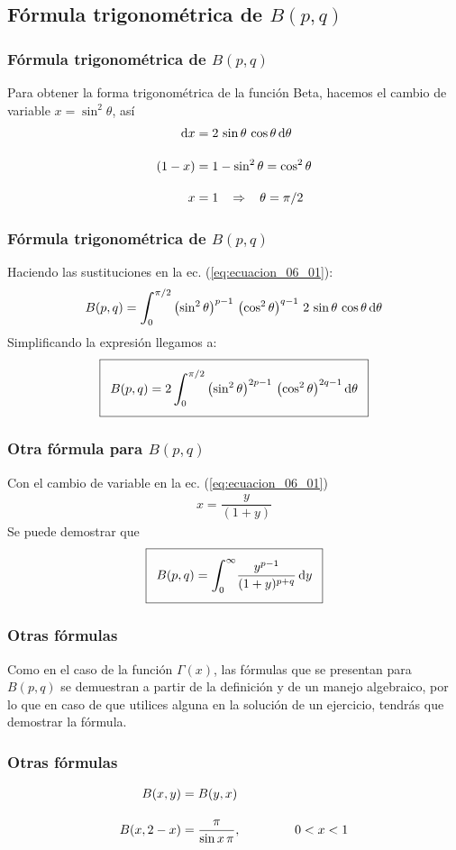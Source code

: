 \documentclass[12pt]{beamer}
\begin{document}
\subsection{Fórmula trigonométrica de \texorpdfstring{$B(p,q)$}{B(p, q)}}
\begin{frame}
\frametitle{Fórmula trigonométrica de $B(p,q)$}
Para obtener la forma trigonométrica de la función Beta, hacemos el cambio de variable $x = \sin^{2} \theta$, así
\begin{align*}
\dd{x} &= 2 \, \sin \theta \, \cos \theta \dd{\theta} \\[1em]
(1 - x) &= 1 - \sin^{2} \theta = \cos^{2} \theta \\[1em]
x &= 1 \hspace{0.3cm} \Rightarrow \hspace{0.3cm} \theta = \pi/2
\end{align*}
\end{frame}
\begin{frame}
\frametitle{Fórmula trigonométrica de $B(p, q)$}
Haciendo las sustituciones en la ec. (\ref{eq:ecuacion_06_01}):
{\fontsize{12}{12}\selectfont
\begin{align}
B(p, q) = \scaleint{6ex}_{\bs 0}^{\pi/2} \left( \sin^{2} \theta \right)^{p-1} \, \left( \cos^{2} \theta \right)^{q-1} \, 2 \, \sin \theta \, \cos \theta \dd{\theta}
\end{align}}
\pause
Simplificando la expresión llegamos a:
{\fontsize{12}{12}\selectfont
\begin{align}
\addtolength{\fboxsep}{5pt}\boxed{B(p, q) = 2 \, \scaleint{6ex}_{\bs 0}^{\pi/2} \left( \sin^{2} \theta \right)^{2p-1} \, \left( \cos^{2} \theta \right)^{2q-1} \dd{\theta}}
\label{eq:ecuacion_06_04}
\end{align}}
\end{frame}
\begin{frame}
\frametitle{Otra fórmula para $B(p, q)$}
Con el cambio de variable en la ec. (\ref{eq:ecuacion_06_01})
\begin{align*}
x = \dfrac{y}{(1 + y)}
\end{align*}
\pause
Se puede demostrar que
\begin{align}
\addtolength{\fboxsep}{5pt}\boxed{B(p, q) = \scaleint{6ex}_{\bs 0}^{\infty} \dfrac{y^{p-1}}{(1 + y)^{p+q}} \dd{y}}
\label{eq:ecuacion_06_05}
\end{align}   
\end{frame}
\begin{frame}
\frametitle{Otras fórmulas}
Como en el caso de la función $\Gamma (x)$, las fórmulas que se presentan para $B(p, q)$ se demuestran a partir de la definición y de un manejo algebraico, por lo que en caso de que utilices alguna en la solución de un ejercicio, tendrás que demostrar la fórmula.
\end{frame}
\begin{frame}
\frametitle{Otras fórmulas}
\begin{align*}
B (x, y) &= B (y, x) \\[1em]
B (x, 2-x) &= \dfrac{\pi}{\sin x \, \pi}, \hspace{1.5cm} 0 < x < 1   
\end{align*}
\end{frame}
\end{document}
